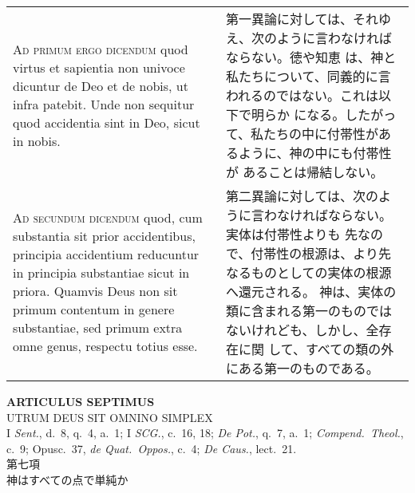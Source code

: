 \documentclass[10pt]{jsarticle}
\begin{document}
\begin{longtable}{p{21em}p{21em}}
\\

{\scshape Ad primum ergo dicendum} quod virtus et sapientia non univoce
 dicuntur de Deo et de nobis, ut infra patebit. Unde non sequitur quod
 accidentia sint in Deo, sicut in nobis.  


&

第一異論に対しては、それゆえ、次のように言わなければならない。徳や知恵
は、神と私たちについて、同義的に言われるのではない。これは以下で明らか
になる。したがって、私たちの中に付帯性があるように、神の中にも付帯性が
あることは帰結しない。

\\

{\scshape Ad secundum dicendum} quod, cum substantia sit prior accidentibus,
 principia accidentium reducuntur in principia substantiae sicut in
 priora. Quamvis Deus non sit primum contentum in genere substantiae,
 sed primum extra omne genus, respectu totius esse.

&

第二異論に対しては、次のように言わなければならない。実体は付帯性よりも
先なので、付帯性の根源は、より先なるものとしての実体の根源へ還元される。
神は、実体の類に含まれる第一のものではないけれども、しかし、全存在に関
して、すべての類の外にある第一のものである。

 
\end{longtable}

\newpage
{}

\begin{center}
 {\Large {\bf ARTICULUS SEPTIMUS}}\\
 {\large UTRUM DEUS SIT OMNINO SIMPLEX}\\
 {\footnotesize I {\itshape Sent.}, d.~8, q.~4, a.~1; I {\itshape SCG.},
 c.~16, 18; {\itshape De Pot.}, q.~7, a.~1; {\itshape Compend.~Theol.},
 c.~9; Opusc.~37, {\itshape de Quat.~Oppos.}, c.~4; {\itshape De Caus.},
 lect.~21.}\\
 {\Large 第七項\\神はすべての点で単純か}
\end{center}
\end{document}
